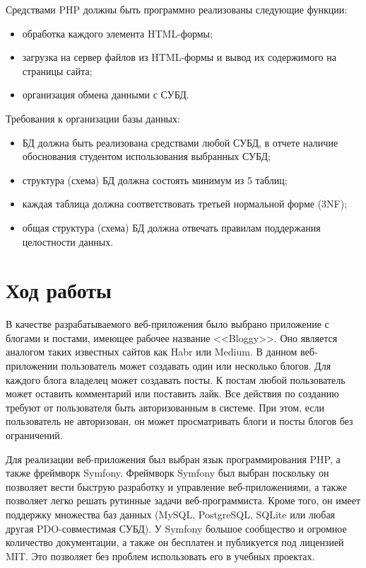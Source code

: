 \documentclass[a4paper, 14pt]{extarticle}
\begin{document}
Средствами PHP должны быть программно реализованы следующие функции:
\begin{itemize}
  \item обработка каждого элемента HTML-формы;
  \item загрузка на сервер файлов из HTML-формы и вывод их содержимого на
  страницы сайта;
  \item организация обмена данными с СУБД.
\end{itemize}

Требования к организации базы данных:
\begin{itemize}
  \item БД должна быть реализована средствами любой СУБД, в отчете наличие
  обоснования студентом использования выбранных СУБД;
  \item структура (схема) БД должна состоять минимум из 5 таблиц;
  \item каждая таблица должна соответствовать третьей нормальной форме (3NF);
  \item общая структура (схема) БД должна отвечать правилам поддержания
  целостности данных.
\end{itemize}

\newpage

\section{Ход работы}

В качестве разрабатываемого веб-приложения было выбрано приложение с блогами и
постами, имеющее рабочее название <<Bloggy>>. Оно является аналогом таких
известных сайтов как Habr или Medium. В данном веб-приложении пользователь может
создавать один или несколько блогов. Для каждого блога владелец может создавать
посты. К постам любой пользователь может оставить комментарий или поставить
лайк. Все действия по созданию требуют от пользователя быть авторизованным в
системе. При этом, если пользователь не авторизован, он может просматривать
блоги и посты блогов без ограничений.

Для реализации веб-приложения был выбран язык программирования PHP, а также
фреймворк Symfony. Фреймворк Symfony был выбран поскольку он позволяет вести
быструю разработку и управление веб-приложениями, а также позволяет легко решать
рутинные задачи веб-программиста. Кроме того, он имеет поддержку множества баз
данных (MySQL, PostgreSQL, SQLite или любая другая PDO-совместимая СУБД). У
Symfony большое сообщество и огромное количество документации, а также он
бесплатен и публикуется под лицензией MIT. Это позволяет без проблем
использовать его в учебных проектах.
\end{document}
